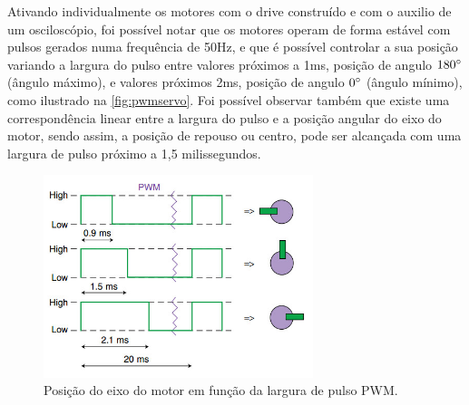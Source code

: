 Ativando individualmente os motores com o drive construído e com o auxilio de um osciloscópio, foi possível notar que os motores operam de forma estável com pulsos gerados numa frequência de 50Hz, e que é possível controlar a sua posição variando a largura do pulso entre valores próximos a 1ms, posição de angulo $180\degree$ (ângulo máximo), e valores próximos 2ms, posição de angulo $0\degree$ (ângulo mínimo), como ilustrado na \autoref{fig:pwmservo}. Foi possível observar também que existe uma correspondência linear entre a largura do pulso e a posição angular do eixo do motor, sendo assim, a posição de repouso ou centro, pode ser alcançada com uma largura de pulso próximo a 1,5 milissegundos. 

\begin{figure}[H]
	\centering
	\includegraphics[width=0.7\textwidth]{figuras/pwm_servo.jpg}
	\caption{Posição do eixo do motor em função da largura de pulso PWM.}
	\label{fig:pwmservo}
\end{figure}

